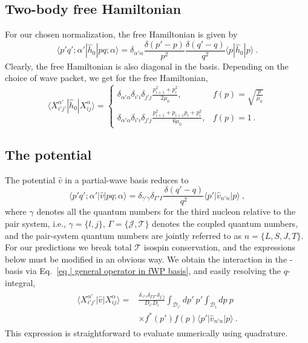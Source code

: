 \documentclass[aps,prc,showpacs,twocolumn,floatfix,nobibnotes,nofootinbib,amsmath,amssymb,longbibliography]{revtex4-2}
\begin{document}
\subsection{Two-body free Hamiltonian}
\label{app | WP free hamiltonian}
For our chosen normalization, the free \NN{} Hamiltonian is given by
\begin{equation}
	\langle p'q';\alpha'|\hat{h}_0|pq;\alpha\rangle = \delta_{\alpha'\alpha}\frac{\delta(p'-p)}{p^2}\frac{\delta(q'-q)}{q^2}\langle p|\hat{h}_{0}|p\rangle \:.
\end{equation}
Clearly, the free Hamiltonian is also diagonal in the \fwp{} basis. Depending on the choice of wave packet, we get for the \NN{} free Hamiltonian,
\begin{equation}
	\langle X_{i'j'}^{\alpha'}|\hat{h}_{0}|X_{ij}^\alpha\rangle = \begin{cases}
	\delta_{\alpha'\alpha}\delta_{i'i}\delta_{j'j}\frac{p_{i+1}^2 + p_{i}^2}{2\mu_0} ,& f(p)=\sqrt{\frac{p}{\mu_0}} \\
	\delta_{\alpha'\alpha}\delta_{i'i}\delta_{j'j}\frac{p_{i+1}^2 + p_{i+1}p_{i} + p_{i}^2}{6\mu_0} ,&f(p)=1 \, .
	\end{cases}
\end{equation}

\subsection{The \NN{} potential}
\label{app | WP potential}
The \NN{} potential $\hat{v}$ in a \NNN{} partial-wave basis reduces to
\begin{equation}
	\langle p'q';\alpha'|\hat{v}|pq;\alpha\rangle = \delta_{\gamma'\gamma}\delta_{\Gamma'\Gamma}\frac{\delta(q'-q)}{q^2}\langle p'|\hat{v}_{n'n}|p\rangle \:,
\end{equation}
where $\gamma$ denotes all the quantum numbers for the third nucleon
relative to the pair system, i.e., $\gamma=\{l,j\}$,
$\Gamma=\{\mathcal{J},\mathcal{T}\}$ denotes the coupled \NNN{}
quantum numbers, and the pair-system quantum numbers are jointly
referred to as $n=\{L,S,J,T\}$. For our predictions we break total
$\mathcal{T}$ isospin conservation, and the expressions below must be modified in
an obvious way. We obtain the \NN{} interaction in the \NNN{} \fwp-basis via Eq.~\eqref{eq | general operator
  in fWP basis}, and easily resolving the $q$-integral,
\begin{align}
	\begin{split}
	\langle X_{i'j'}^{\alpha'}|\hat{v}|X_{ij}^\alpha\rangle = &\frac{\delta_{\gamma'\gamma}\delta_{\Gamma \Gamma'}\delta_{j'j}}{D_{i'}D_i}\int_{\mathcal{D}_{i'}} dp'\:p'
	\int_{\mathcal{D}_{i}} dp\:p \\
	&\times f^*(p')f(p)\langle p'|\hat{v}_{n'n}|p\rangle \:.
	\end{split}
\end{align}
This expression is straightforward to evaluate numerically using quadrature.
\end{document}
